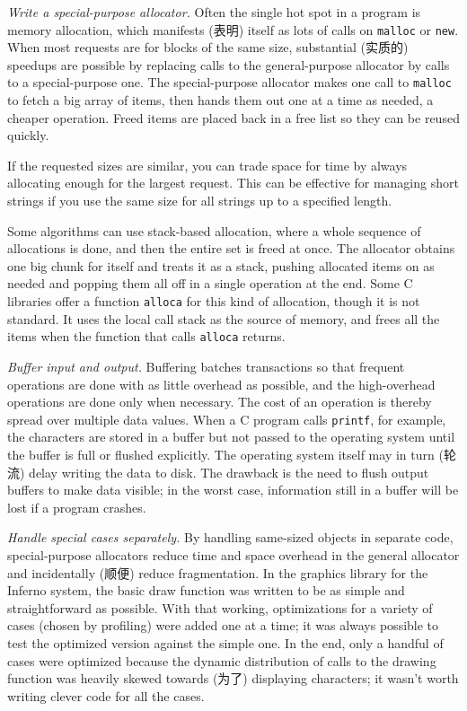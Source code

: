 \emph{Write a special-purpose allocator.} Often the single hot spot in a
program is memory allocation, which manifests (表明) itself as lots of
calls on \verb'malloc' or \verb'new'. When most requests are for blocks of
the same size, substantial (实质的) speedups are possible by replacing
calls to the general-purpose allocator by calls to a special-purpose one.
The special-purpose allocator makes one call to \verb'malloc' to fetch a
big array of items, then hands them out one at a time as needed, a cheaper
operation. Freed items are placed back in a free list so they can be reused
quickly.

If the requested sizes are similar, you can trade space for time by always
allocating enough for the largest request. This can be effective for
managing short strings if you use the same size for all strings up to a
specified length.

Some algorithms can use stack-based allocation, where a whole sequence of
allocations is done, and then the entire set is freed at once. The
allocator obtains one big chunk for itself and treats it as a stack,
pushing allocated items on as needed and popping them all off in a single
operation at the end. Some C libraries offer a function \verb'alloca' for
this kind of allocation, though it is not standard. It uses the local call
stack as the source of memory, and frees all the items when the function
that calls \verb'alloca' returns.

\emph{Buffer input and output.} Buffering batches transactions so that
frequent operations are done with as little overhead as possible, and the
high-overhead operations are done only when necessary. The cost of an
operation is thereby spread over multiple data values. When a C program
calls \verb'printf', for example, the characters are stored in a buffer but
not passed to the operating system until the buffer is full or flushed
explicitly. The operating system itself may in turn (轮流) delay writing
the data to disk. The drawback is the need to flush output buffers to make
data visible; in the worst case, information still in a buffer will be lost
if a program crashes.

\emph{Handle special cases separately.} By handling same-sized objects in
separate code, special-purpose allocators reduce time and space overhead in
the general allocator and incidentally (顺便) reduce fragmentation. In the
graphics library for the Inferno system, the basic draw function was
written to be as simple and straightforward as possible. With that working,
optimizations for a variety of cases (chosen by profiling) were added one
at a time; it was always possible to test the optimized version against the
simple one.  In the end, only a handful of cases were optimized because the
dynamic distribution of calls to the drawing function was heavily skewed
towards (为了) displaying characters; it wasn't worth writing clever code
for all the cases.

